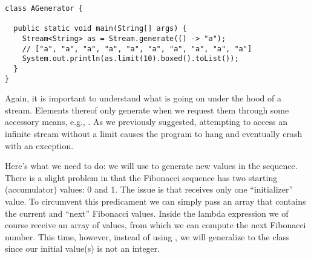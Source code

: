 \begin{cl}[]{}
\begin{lstlisting}[language=MyJava]
class AGenerator {

  public static void main(String[] args) {
    Stream<String> as = Stream.generate(() -> "a");
    // ["a", "a", "a", "a", "a", "a", "a", "a", "a", "a"]
    System.out.println(as.limit(10).boxed().toList()); 
  } 
}
\end{lstlisting}
\end{cl}

Again, it is important to understand what is going on under the hood of a stream. Elements thereof only generate when we request them through some accessory means, e.g., . As we previously suggested, attempting to access an infinite stream without a limit causes the program to hang and eventually crash with an  exception.


Here's what we need to do: we will use  to generate new values in the sequence. There is a slight problem in that the Fibonacci sequence has two starting (accumulator) values: $0$ and $1$. The issue is that  receives only one ``initializer'' value. To circumvent this predicament we can simply pass an array that contains the current and ``next'' Fibonacci values. Inside the lambda expression we of course receive an array of values, from which we can compute the next Fibonacci number. This time, however, instead of using , we will generalize to the  class since our initial value(s) is not an integer.


